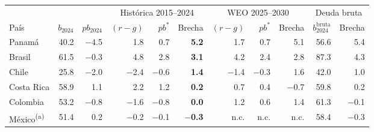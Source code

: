 \begin{tabular}{lrrrrrrrrrr}
\toprule
& & & \multicolumn{3}{c}{Histórica 2015--2024} & \multicolumn{3}{c}{WEO 2025--2030} & \multicolumn{2}{c}{Deuda bruta} \\
\cmidrule(lr){4-6}\cmidrule(lr){7-9}\cmidrule(lr){10-11}
País & $b_{2024}$ & $pb_{2024}$ & $(r-g)$ & $pb^{*}$ & Brecha & $(r-g)$ & $pb^{*}$ & Brecha & $b^{\text{bruta}}_{2024}$ & Brecha \\
\midrule
Panamá & 40.2 & $-$4.5 & 1.8 & 0.7 & \textbf{5.2} & 1.7 & 0.7 & 5.1 & 56.6 & 5.4 \\
Brasil & 61.5 & $-$0.3 & 4.8 & 2.8 & \textbf{3.1} & 4.2 & 2.4 & 2.8 & 87.3 & 4.3 \\
Chile & 25.8 & $-$2.0 & $-$2.4 & $-$0.6 & \textbf{1.4} & $-$1.4 & $-$0.3 & 1.6 & 42.0 & 1.0 \\
Costa Rica & 58.9 & 1.1 & 2.2 & 1.2 & \textbf{0.2} & 0.7 & 0.4 & $-$0.7 & 59.8 & 0.2 \\
Colombia & 53.2 & $-$0.8 & $-$1.6 & $-$0.8 & \textbf{0.0} & 1.2 & 0.6 & 1.4 & 61.3 & $-$0.1 \\
México\textsuperscript{(a)} & 51.4 & 0.2 & $-$0.2 & $-$0.1 & \textbf{$-$0.3} & n.c. & n.c. & n.c. & 58.4 & $-$0.3 \\
\bottomrule
\end{tabular}
